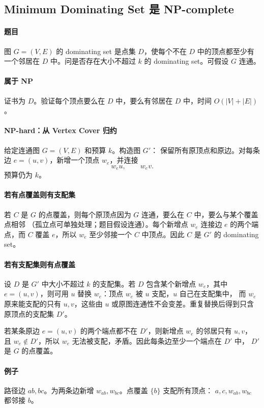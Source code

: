 \documentclass[UTF8,openany,12pt]{ctexbook}
\theoremstyle{remark}
\begin{document}
\subsection{Minimum Dominating Set 是 NP-complete}

\paragraph{题目}
图 $G=(V,E)$ 的 dominating set 是点集 $D$，使每个不在 $D$ 中的顶点都至少有一个邻居在
$D$ 中。问是否存在大小不超过 $k$ 的 dominating set。可假设 $G$ 连通。

\paragraph{属于 NP}
证书为 $D$。验证每个顶点要么在 $D$ 中，要么有邻居在 $D$ 中，时间 $O(|V|+|E|)$。

\paragraph{NP-hard：从 Vertex Cover 归约}
给定连通图 $G=(V,E)$ 和预算 $k$。构造图 $G'$：
保留所有原顶点和原边。对每条边 $e=(u,v)$，新增一个顶点 $w_e$，并连接
\[
  w_eu,\qquad w_ev.
\]
预算仍为 $k$。

\paragraph{若有点覆盖则有支配集}
若 $C$ 是 $G$ 的点覆盖，则每个原顶点因为 $G$ 连通，要么在 $C$ 中，要么与某个覆盖点相邻
（孤立点可单独处理；题目假设连通）。每个新增点 $w_e$ 连接边 $e$ 的两个端点，而 $C$
覆盖 $e$，所以 $w_e$ 至少邻接一个 $C$ 中顶点。因此 $C$ 是 $G'$ 的 dominating set。

\paragraph{若有支配集则有点覆盖}
设 $D$ 是 $G'$ 中大小不超过 $k$ 的支配集。若 $D$ 包含某个新增点 $w_e$，其中
$e=(u,v)$，则可用 $u$ 替换 $w_e$：顶点 $w_e$ 被 $u$ 支配，$u$ 自己在支配集中，
而 $w_e$ 原来能支配的只有 $u,v$，这些由 $u$ 或原图连通性不会变差。重复替换后得到只含原顶点的支配集 $D'$。

若某条原边 $e=(u,v)$ 的两个端点都不在 $D'$，则新增点 $w_e$ 的邻居只有 $u,v$，
且 $w_e\notin D'$，所以 $w_e$ 无法被支配，矛盾。因此每条边至少一个端点在 $D'$ 中，
$D'$ 是 $G$ 的点覆盖。

\paragraph{例子}
路径边 $ab,bc$。为两条边新增 $w_{ab},w_{bc}$。点覆盖 $\{b\}$ 支配所有顶点：
$a,c,w_{ab},w_{bc}$ 都邻接 $b$。
\end{document}

